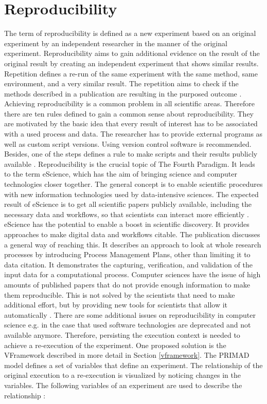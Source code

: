 \documentclass[draft,final]{vutinfth} %
\begin{document}
\section{Reproducibility}\label{Reproducibility}
The term of reproducibility is defined as a new experiment based on an original experiment by an independent researcher in the manner of the original experiment. Reproducibility aims to gain additional evidence on the result of the original result by creating an independent experiment that shows similar results. Repetition defines a re-run of the same experiment with the same method, same environment, and a very similar result. The repetition aims to check if the methods described in a publication are resulting in the purposed outcome \cite{6064509}. 
Achieving reproducibility is a common problem in all scientific areas. Therefore there are ten rules defined to gain a common sense about reproducibility. They are motivated by the basic idea that every result of interest has to be associated with a used \gls{process} and data. The researcher has to provide external programs as well as custom script versions. Using version control software is recommended. Besides, one of the steps defines a rule to make scripts and their results publicly available \cite{10.1371/journal.pcbi.1003285}. 
Reproducibility is the crucial topic of The Fourth Paradigm. It leads to the term eScience, which has the aim of bringing science and computer technologies closer together. The general concept is to enable scientific procedures with new information technologies used by data-intensive sciences. The expected result of eScience is to get all scientific papers publicly available, including the necessary data and workflows, so that scientists can interact more efficiently \cite{noauthororeditorfourth}. 
eScience has the potential to enable a boost in scientific discovery. It provides approaches to make digital data and workflows citable. The publication \cite{Rauber2015RepeatabilityAR} discusses a general way of reaching this. It describes an approach to look at whole research processes by introducing Process Management Plans, other than limiting it to data citation. It demonstrates the capturing, verification, and validation of the input data for a computational process.
Computer sciences have the issue of high amounts of published papers that do not provide enough information to make them reproducible. This is not solved by the scientists that need to make additional effort, but by providing new tools for scientists that allow it automatically  \cite{MIKSA201725}. There are some additional issues on reproducibility in computer science e.g. in the case that used software technologies are deprecated and not available anymore. Therefore, persisting the execution context is needed to achieve a re-execution of the experiment. One proposed solution is the VFramework described in more detail in Section \ref{vframework}. 
The PRIMAD model defines a set of variables that define an experiment. The relationship of the original execution to a re-execution is visualized by noticing changes in the variables. The following variables of an experiment are used to describe the relationship \cite{primad}:
\end{document}
